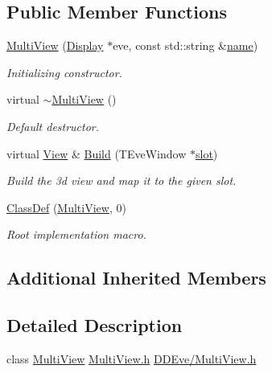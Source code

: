 \subsection*{Public Member Functions}
\begin{DoxyCompactItemize}
\item 
\hyperlink{class_d_d4hep_1_1_multi_view_ad9a1e2b93bc146e75fe38f437a075fe6}{Multi\+View} (\hyperlink{class_d_d4hep_1_1_display}{Display} $\ast$eve, const std\+::string \&\hyperlink{class_d_d4hep_1_1_view_ae369eadf16399a6bf34f1ce491b7a788}{name})
\begin{DoxyCompactList}\small\item\em Initializing constructor. \end{DoxyCompactList}\item 
virtual \hyperlink{class_d_d4hep_1_1_multi_view_a3099211ad2f32090dd83aa6c7447db9f}{$\sim$\+Multi\+View} ()
\begin{DoxyCompactList}\small\item\em Default destructor. \end{DoxyCompactList}\item 
virtual \hyperlink{class_d_d4hep_1_1_view}{View} \& \hyperlink{class_d_d4hep_1_1_multi_view_a7343f8ab0d599e5ee1b9b471a12a00a8}{Build} (T\+Eve\+Window $\ast$\hyperlink{_multi_view_8cpp_a402e7b855ac7bcf09e2ecf5e98220a11}{slot})
\begin{DoxyCompactList}\small\item\em Build the 3d view and map it to the given slot. \end{DoxyCompactList}\item 
\hyperlink{class_d_d4hep_1_1_multi_view_ae1b4bd4c3527dfe174acada259e6514c}{Class\+Def} (\hyperlink{class_d_d4hep_1_1_multi_view}{Multi\+View}, 0)
\begin{DoxyCompactList}\small\item\em Root implementation macro. \end{DoxyCompactList}\end{DoxyCompactItemize}
\subsection*{Additional Inherited Members}


\subsection{Detailed Description}
class \hyperlink{class_d_d4hep_1_1_multi_view}{Multi\+View} \hyperlink{_multi_view_8h}{Multi\+View.\+h} \hyperlink{_multi_view_8h}{D\+D\+Eve/\+Multi\+View.\+h} 


